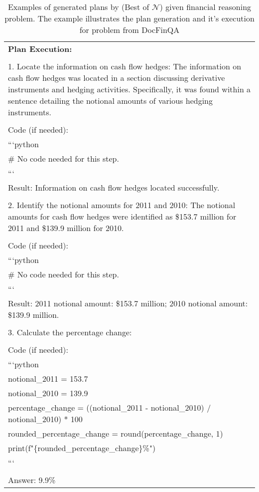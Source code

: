 \begin{table*}
\begin{tabular}{p{\linewidth}}
\textbf{Plan Execution:}\\ \\ 1. Locate the information on cash flow hedges: The information on cash flow hedges was located in a section discussing derivative instruments and hedging activities. Specifically, it was found within a sentence detailing the notional amounts of various hedging instruments.\\ \\    Code (if needed):\\    ```python\\    \# No code needed for this step.\\    ```\\    Result: Information on cash flow hedges located successfully.\\ \\ 2. Identify the notional amounts for 2011 and 2010: The notional amounts for cash flow hedges were identified as \$153.7 million for 2011 and \$139.9 million for 2010.\\ \\    Code (if needed):\\    ```python\\    \# No code needed for this step.\\    ```\\    Result: 2011 notional amount: \$153.7 million; 2010 notional amount: \$139.9 million.\\ \\ 3. Calculate the percentage change:\\ \\    Code (if needed):\\    ```python\\    notional\_2011 = 153.7\\    notional\_2010 = 139.9\\    percentage\_change = ((notional\_2011 - notional\_2010) / notional\_2010) * 100\\    rounded\_percentage\_change = round(percentage\_change, 1)\\    print(f"\{rounded\_percentage\_change\}\%")\\    ```\\ \\ Answer: 9.9\% \\ \bottomrule
\end{tabular}
\caption{Examples of generated plans by \plangen{} (Best of $\mathcal{N}$) given financial reasoning problem. The example illustrates the plan generation and it's execution for problem from DocFinQA}
\label{tab:docfinqa_example}
\end{table*}
